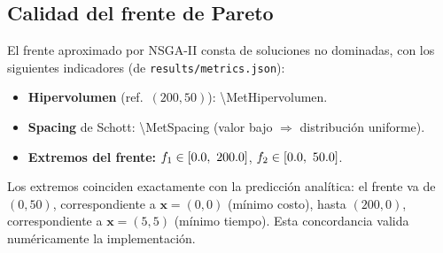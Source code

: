 \subsection{Calidad del frente de Pareto}

El frente aproximado por NSGA-II consta de \MetNSol{} soluciones no dominadas,
con los siguientes indicadores (de \texttt{results/metrics.json}):

\begin{itemize}[noitemsep]
  \item \textbf{Hipervolumen} (ref.\ $(\num{200},\num{50})$):
        \num{\MetHipervolumen}.
  \item \textbf{Spacing} de Schott: \num{\MetSpacing} (valor bajo $\Rightarrow$
        distribución uniforme).
  \item \textbf{Extremos del frente:} $f_1 \in [\num{\MetMinFuno},\ \num{\MetMaxFuno}]$,
        $f_2 \in [\num{0.0},\ \num{50.0}]$.
\end{itemize}

Los extremos coinciden exactamente con la predicción analítica: el frente va
de $(\num{0}, \num{50})$, correspondiente a $\mathbf{x}=(0,0)$ (mínimo costo),
hasta $(\num{200}, \num{0})$, correspondiente a $\mathbf{x}=(5,5)$ (mínimo
tiempo). Esta concordancia valida numéricamente la implementación.
